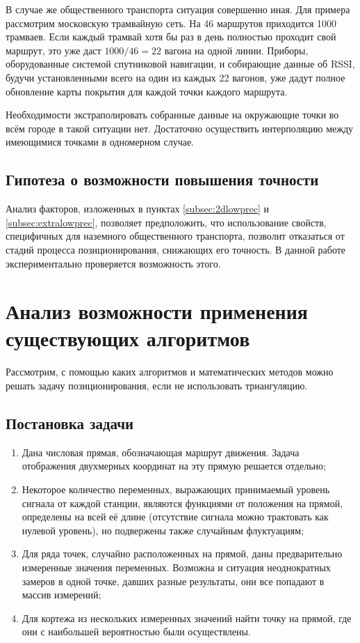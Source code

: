 В случае же общественного транспорта ситуация совершенно иная. Для примера рассмотрим московскую трамвайную сеть. На 46 маршрутов приходится 1000 трамваев\cite{ruwikimostram}. Если каждый трамвай хотя бы раз в день полностью проходит свой маршрут, это уже даст $1000/46 = 22$ вагона на одной линии. Приборы, оборудованные системой спутниковой навигации, и собирающие данные об RSSI, будучи установленными всего на один из каждых 22 вагонов, уже дадут полное обновление карты покрытия для каждой точки каждого маршрута.

Необходимости экстраполировать собранные данные на окружающие точки во всём городе в такой ситуации нет. Достаточно осуществить интерполяцию между имеющимися точками в одномерном случае.

\subsection{Гипотеза о возможности повышения точности}
Анализ факторов, изложенных в пунктах \ref{subsec:2dlowprec} и \ref{subsec:extralowprec}, позволяет предположить, что использование свойств, специфичных для наземного общественного транспорта, позволит отказаться от стадий процесса позиционирования, снижающих его точность. В данной работе экспериментально проверяется возможность этого.

\section{Анализ возможности применения существующих алгоритмов}
Рассмотрим, с помощью каких алгоритмов и математических методов можно решать задачу позиционирования, если не использовать триангуляцию.

\subsection{Постановка задачи}
\begin{enumerate}
	\item
		Дана числовая прямая, обозначающая маршрут движения. Задача отображения двухмерных координат на эту прямую решается отдельно;
	\item
		Некоторое количество переменных, выражающих принимаемый уровень сигнала от каждой станции, являются функциями от положения на прямой, определены на всей её длине (отсутствие сигнала можно трактовать как нулевой уровень), но подвержены также случайным флуктуациям;
	\item
		Для ряда точек, случайно расположенных на прямой, даны предварительно измеренные значения переменных. Возможна и ситуация неоднократных замеров в одной точке, давших разные результаты, они все попадают в массив измерений;
	\item
		Для кортежа из нескольких измеренных значений найти точку на прямой, где они с наибольшей вероятностью были осуществлены.
\end{enumerate}

